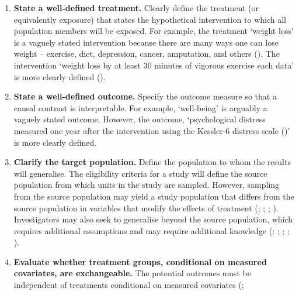 \documentclass[
  single column]{article}
\begin{document}
\begin{enumerate}
\def\labelenumi{\arabic{enumi}.}
\item
  \textbf{State a well-defined treatment.} Clearly define the treatment
  (or equivalently exposure) that states the hypothetical intervention
  to which all population members will be exposed. For example, the
  treatment `weight loss' is a vaguely stated intervention because there
  are many ways one can lose weight -- exercise, diet, depression,
  cancer, amputation, and others (). The intervention `weight loss by at least 30
  minutes of vigorous exercise each data' is more clearly defined
  ().
\item
  \textbf{State a well-defined outcome.} Specify the outcome measure so
  that a causal contrast is interpretable. For example, `well-being' is
  arguably a vaguely stated outcome. However, the outcome,
  `psychological distress measured one year after the intervention using
  the Kessler-6 distress scale ()' is more clearly defined.
\item
  \textbf{Clarify the target population.} Define the population to whom
  the results will generalise. The eligibility criteria for a study will
  define the source population from which units in the study are
  sampled. However, sampling from the source population may yield a
  study population that differs from the source population in variables
  that modify the effects of treatment
  (;
  ;
  ;
  ).
  Investigators may also seek to generalise beyond the source
  population, which requires additional assumptions and may require
  additional knowledge (; ; ;
  ;
  ).
\item
  \textbf{Evaluate whether treatment groups, conditional on measured
  covariates, are exchangeable.} The potential outcomes must be
  independent of treatments conditional on measured covariates
  (;

\end{enumerate}
\end{document}
